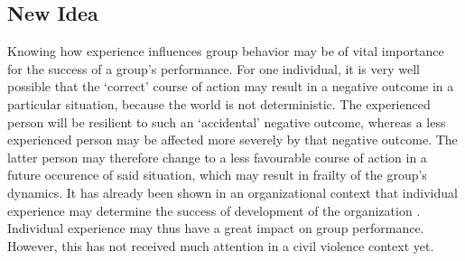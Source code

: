 \subsection{New Idea}
Knowing how experience influences group behavior may be of vital importance for the success of a group's performance.
For one individual, it is very well possible that the `correct' course of action may result in a negative outcome in a particular situation, because the world is not deterministic.
The experienced person will be resilient to such an `accidental' negative outcome, whereas a less experienced person may be affected more severely by that negative outcome.
The latter person may therefore change to a less favourable course of action in a future occurence of said situation, which may result in frailty of the group's dynamics.
It has already been shown in an organizational context that individual experience may determine the success of development of the organization \citep*{reagans2005individual}.
Individual experience may thus have a great impact on group performance.
However, this has not received much attention in a civil violence context yet.
